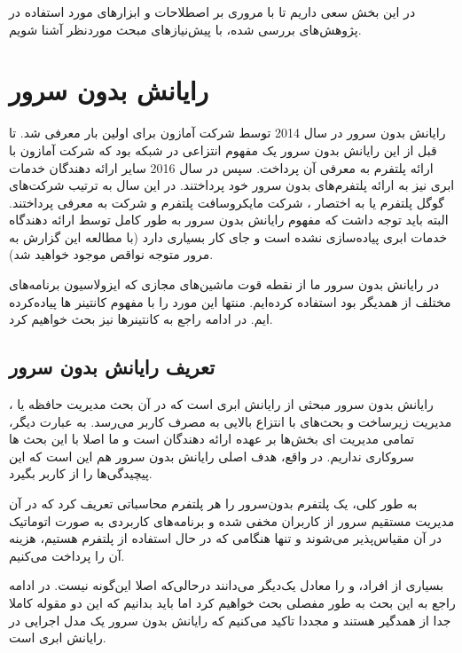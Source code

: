 \label{literature}
در این بخش سعی داریم تا با مروری بر اصطلاحات و ابزارهای مورد استفاده در پژوهش‌های بررسی شده، با پیش‌نیازهای مبحث موردنظر آشنا شویم. 
\section{رایانش بدون سرور}
رایانش بدون سرور در سال 2014 توسط شرکت آمازون برای اولین بار معرفی شد. تا قبل از این رایانش بدون سرور یک مفهوم انتزاعی  در شبکه بود که شرکت آمازون با ارائه پلتفرم  به معرفی آن پرداخت. سپس در سال 2016 سایر ارائه دهندگان خدمات ابری نیز به ارائه پلتفرم‌های بدون سرور خود پرداختند. در این سال به ترتیب شرکت‌های گوگل پلتفرم  یا به اختصار ، شرکت مایکروسافت پلتفرم  و شرکت  به معرفی  پرداختند. البته باید توجه داشت که مفهوم رایانش بدون سرور به طور کامل توسط ارائه دهندگاه خدمات ابری پیاده‌سازی نشده است و جای کار بسیاری دارد (با مطالعه این گزارش به مرور متوجه نواقص موجود خواهید شد).

در رایانش بدون سرور ما از نقطه قوت ماشین‌های مجازی که ایزولاسیون برنامه‌های مختلف از همدیگر بود استفاده کرده‌ایم. منتها این مورد را با مفهوم کانتینر ها پیاده‌کرده ایم. در ادامه راجع به کانتینرها نیز بحث خواهیم کرد. 

\subsection{تعریف رایانش بدون سرور}
رایانش بدون سرور مبحثی از رایانش ابری است که در آن بحث مدیریت حافظه یا ، مدیریت زیرساخت و بحث‌های  با انتزاع بالایی به مصرف کاربر می‌رسد. به عبارت دیگر، تمامی مدیریت ای بخش‌ها بر عهده ارائه دهندگان است و ما اصلا با این بحث ها سروکاری نداریم. در واقع، هدف اصلی رایانش بدون سرور هم این است که این پیچیدگی‌ها را از کاربر بگیرد. 

به طور کلی، یک‌ پلتفرم بدون‌سرور را هر پلتفرم محاسباتی تعریف کرد که در آن مدیریت مستقیم سرور از کاربران مخفی شده و برنامه‌های کاربردی به صورت اتوماتیک در آن مقیاس‌پذیر می‌شوند و تنها هنگامی که در حال استفاده از پلتفرم هستیم، هزینه آن را پرداخت می‌کنیم. \cite{The_Rise_of_Serverless_Computing}


بسیاری از افراد،  و  را معادل یک‌دیگر می‌دانند درحالی‌که اصلا این‌گونه نیست. در ادامه راجع به این بحث به طور مفصلی بحث خواهیم کرد اما باید بدانیم که این دو مقوله کاملا جدا از همدگیر هستند و مجددا تاکید می‌کنیم که رایانش بدون سرور یک مدل اجرایی در رایانش ابری است. 

